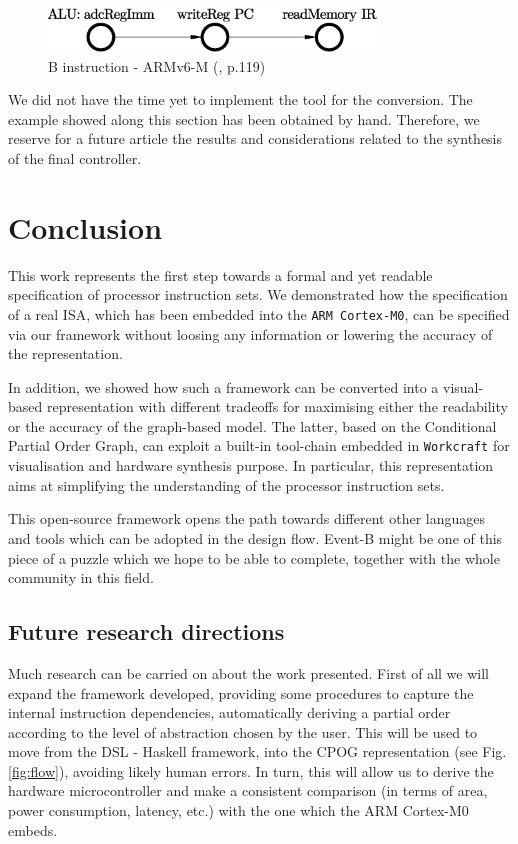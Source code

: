 \documentclass[conference]{IEEEtran}
\begin{document}
\begin{figure}[ht!]
\begin{center}
	\includegraphics[width=8.7cm]{IMG/b.eps}
	\caption{B instruction - ARMv6-M (\cite{armManual}, p.119)}
	\label{fig:bPO}
\end{center}
\end{figure}

We did not have the time yet to implement the tool for the conversion.
The example showed along this section has been obtained by hand. Therefore, we reserve for a
future article the results and considerations related to the synthesis of the final
controller.


\section{Conclusion}
\label{sec:conclusion}
This work represents the first step towards a formal and yet readable specification of
processor instruction sets. We demonstrated how the specification of a real ISA, which has
been embedded into the \verb|ARM Cortex-M0|, can be specified via our framework without
loosing any information or lowering the accuracy of the representation.

In addition, we showed how such a framework can be converted into a visual-based
representation with different tradeoffs for maximising either the readability or the accuracy
of the graph-based model. The latter, based on the Conditional Partial Order Graph, can
exploit a built-in tool-chain embedded in \verb|Workcraft| for visualisation and hardware
synthesis purpose. In particular, this representation aims at simplifying the understanding of
the processor instruction sets.

This open-source framework opens the path towards different other languages and tools which
can be adopted in the design flow. Event-B might be one of this piece of a puzzle which we
hope to be able to complete, together with the whole community in this field.

\subsection{Future research directions}
\label{sec:frd}
Much research can be carried on about the work presented. First of all we will expand the
framework developed, providing some procedures to capture the internal instruction
dependencies, automatically deriving a partial order according to the level of abstraction
chosen by the user. This will be used to move from the DSL - Haskell framework, into the CPOG
representation (see Fig. \ref{fig:flow}), avoiding likely human errors. In turn, this will
allow us to derive the hardware microcontroller and make a consistent comparison (in terms of
area, power consumption, latency, etc.) with the one which the ARM Cortex-M0 embeds.
\end{document}
